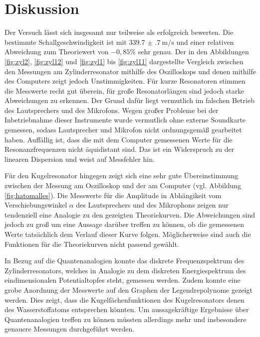 \section{Diskussion}
\label{sec:Diskussion}

Der Versuch lässt sich insgesamt nur teilweise als erfolgreich bewerten. Die bestimmte
Schallgeschwindigkeit ist mit $\SI{339.7(7)}{\meter\per\second}$ und einer relativen Abweichung zum Theoriewert
von $-0{,}85\%$ sehr genau.
Der in den Abbildungen \ref{fig:zyl2}, \ref{fig:zyl12} und \ref{fig:zyl1} bis \ref{fig:zyl11}
dargestellte Vergleich zwischen den Messungen am Zylinderresonator mithilfe des Oszilloskops und denen mithilfe des
Computers zeigt jedoch Unstimmigkeiten. Für kurze Resonatoren stimmen die Messwerte recht
gut überein, für große Resonatorlängen sind jedoch starke Abweichungen zu erkennen. Der Grund
dafür liegt vermutlich im falschen Betrieb des Lautsprechers und des Mikrofons. Wegen großer
Probleme bei der Inbetriebnahme dieser Instrumente wurde vermutlich ohne externe Soundkarte
gemessen, sodass Lautsprecher und Mikrofon nicht ordnungsgemäß gearbeitet haben.
Auffällig ist, dass die mit dem Computer gemessenen Werte für die Resonanzfrequenzen
nicht äquidistant sind. Das ist ein Widerspruch zu der linearen Dispersion und weist auf
Messfehler hin.

Für den Kugelresonator hingegen zeigt sich eine sehr gute Übereinstimmung zwischen der Messung
am Oszilloskop und der am Computer (vgl. Abbildung \ref{fig:hatomalles}). Die Messwerte für die
Amplitude in Abhängikeit vom Verschiebungswinkel $\alpha$ des Lautsprechers und des Mikrophons
zeigen nur tendenziell eine Analogie zu den gezeigten Theoriekurven. Die Abweichungen sind
jedoch zu groß um eine Aussage darüber treffen zu können, ob die gemessenen Werte
tatsächlich dem Verlauf dieser Kurve folgen. Möglicherweise sind auch die Funktionen
für die Theoriekurven nicht passend gewählt.

In Bezug auf die Quantenanalogien konnte das diskrete Frequenzspektrum des Zylinderresonators, welches in Analogie zu dem diskreten Energiespektrum des eindimensionalen Potentialtopfes steht, gemessen werden. Zudem konnte
eine grobe Anordnung der Messwerte auf den Graphen der Legendrepolynome gezeigt werden. Dies zeigt, dass die Kugelfächenfunktionen des Kugelresonators denen des
Wasserstoffatoms entsprechen könnten. Um aussagekräftige Ergebnisse über Quantenanalogien treffen zu können müssten allerdings mehr und insbesondere genauere Messungen durchgeführt werden.
